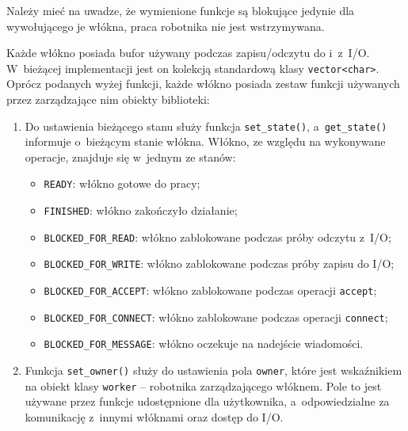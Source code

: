 \documentclass[12pt]{mwart}
\newcommand{\code}{\texttt}
\newcommand{\procbr}{()}
\newcommand{\function}[1]{\code{#1\procbr}}
\begin{document}
  Należy mieć na uwadze, że wymienione funkcje są blokujące jedynie dla wywołującego je włókna, praca robotnika nie jest wstrzymywana.
\par
\indent
  Każde włókno posiada bufor używany podczas zapisu/odczytu do i~z~I/O. W~bieżącej implementacji jest on kolekcją standardową klasy \code{vector<char>}. 
  Oprócz podanych wyżej funkcji, każde włókno posiada zestaw funkcji używanych przez zarządzające nim obiekty biblioteki:
  \begin{enumerate}
    \item Do ustawienia bieżącego stanu służy funkcja \function{set\_state}, a~\function{get\_state} informuje o~bieżącym stanie włókna.
    Włókno, ze względu na wykonywane operacje, znajduje się w~jednym ze stanów:
    \begin{itemize}
      \item \code{READY}: włókno gotowe do pracy;
      \item \code{FINISHED}: włókno zakończyło działanie;
      \item \code{BLOCKED\_FOR\_READ}: włókno zablokowane podczas próby odczytu z~I/O;
      \item \code{BLOCKED\_FOR\_WRITE}:  włókno zablokowane podczas próby zapisu \linebreak do I/O;
      \item \code{BLOCKED\_FOR\_ACCEPT}:  włókno zablokowane podczas operacji \code{accept};
      \item \code{BLOCKED\_FOR\_CONNECT}:  włókno zablokowane podczas operacji \code{connect};
      \item \code{BLOCKED\_FOR\_MESSAGE}:  włókno oczekuje na nadejście wiadomości.
    \end{itemize}
    \item Funkcja \function{set\_owner} służy do ustawienia pola \code{owner}, które jest wskaźnikiem na obiekt klasy \code{worker} -- robotnika 
    zarządzającego włóknem. Pole to jest używane przez funkcje udostępnione dla użytkownika, a~odpowiedzialne za komunikację z~innymi włóknami oraz dostęp do I/O.
  \end{enumerate}
\par
\end{document}
